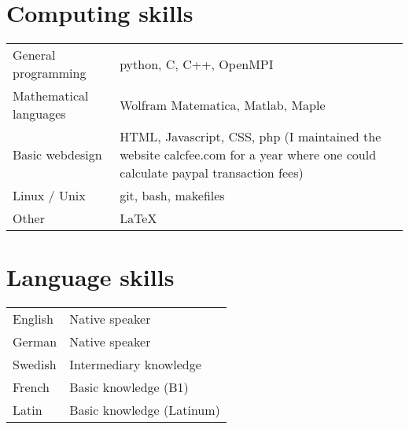 \documentclass[11pt, letterpaper]{article}
\begin{document}
\section{Computing skills}
\begin{tabularx}{\textwidth}{p{45mm} X}
  General programming & python, C, C++, OpenMPI \\ [1ex]
  Mathematical languages & Wolfram Matematica, Matlab, Maple \\ [1ex]
  Basic webdesign & HTML, Javascript, CSS, php (I maintained the website calcfee.com for a year where one could calculate paypal transaction fees) \\ [1ex]
  Linux / Unix & git, bash, makefiles \\ [1ex]
  Other & \LaTeX
\end{tabularx}

\section{Language skills}
\begin{tabularx}{\textwidth}{p{45mm} X}
  English & Native speaker \\ [1ex]
  German & Native speaker \\ [1ex]
  Swedish & Intermediary knowledge \\ [1ex]
  French & Basic knowledge (B1) \\ [1ex]
  Latin & Basic knowledge (Latinum)
\end{tabularx}
\end{document}
